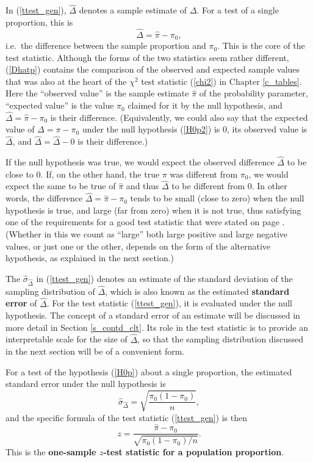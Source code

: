 In (\ref{ttest_gen}), $\hat{\Delta}$ denotes a sample estimate of
$\Delta$. For a test of a single proportion, this is
\begin{equation}
\hat{\Delta} = \hat{\pi}-\pi_{0},
\label{Dhatp}
\end{equation}
i.e.\ the difference between the sample proportion and $\pi_{0}$. This
is the core of the test statistic. Although the forms of the two
statistics seem rather different, (\ref{Dhatp}) contains the
comparison of the observed and expected sample values that was also at the
heart of the $\chi^{2}$ test statistic (\ref{chi2}) in Chapter
\ref{c_tables}. Here the ``observed value'' is the sample estimate $\hat{\pi}$
of the probability parameter, ``expected value'' is the value $\pi_{0}$
claimed for it by the null hypothesis, and
$\hat{\Delta}=\hat{\pi}-\pi_{0}$ is their difference. (Equivalently, we
could also say that the expected value of $\Delta=\pi-\pi_{0}$ under the null
hypothesis (\ref{H0p2}) is 0, its observed value is $\hat{\Delta}$, and
$\hat{\Delta}=\hat{\Delta}-0$ is their difference.)

If the null hypothesis was true, we would expect the observed difference
$\hat{\Delta}$ to be close to 0. If, on the other hand, the true
$\pi$ was different from $\pi_{0}$, we would expect the same to be true
of $\hat{\pi}$ and thus $\hat{\Delta}$ to be different from 0. In other
words, the difference $\hat{\Delta}=\hat{\pi}-\pi_{0}$ tends to be small
(close to zero) when the null hypothesis is true, and large (far from
zero) when it is not true, thus satisfying one of the requirements for a
good test statistic that were stated on page \pageref{p_2reqs}. (Whether
in this we count as ``large'' both large positive and large negative
values, or just one or the other, depends on the form of the alternative
hypothesis, as explained in the next section.)

The $\hat{\sigma}_{\hat{\Delta}}$ in (\ref{ttest_gen}) denotes an
estimate of the standard deviation of the sampling distribution of
$\hat{\Delta}$, which is also known as the estimated \textbf{standard
error} of $\hat{\Delta}$. For the test statistic (\ref{ttest_gen}), it
is evaluated under the null hypothesis. The concept of a standard error
of an estimate will be discussed in more detail in Section
\ref{s_contd_clt}. Its role in the test statistic is to provide an
interpretable scale for the size  of $\hat{\Delta}$, so that
the sampling distribution discussed in the next section will be of
a convenient form.

For a test of the hypothesis (\ref{H0p}) about a single proportion,
the estimated standard error under the
null hypothesis is
\begin{equation}
\hat{\sigma}_{\hat{\Delta}} = \sqrt{\frac{\pi_{0}(1-\pi_{0})}{n}},
\label{seDhatp}
\end{equation}
and the specific formula of the test statistic (\ref{ttest_gen})
is then
\begin{equation}
z=\frac{\hat{\pi}-\pi_{0}}
{\sqrt{\pi_{0}(1-\pi_{0})/n}}.
\label{ztestp}
\end{equation}
This is the \textbf{one-sample
$z$-test statistic for a population proportion}.

